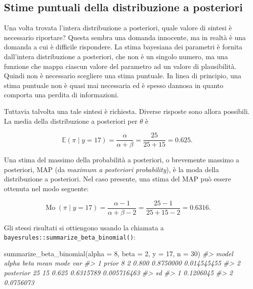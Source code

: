 \documentclass[
  11pt,
  italian,
  a4paper,
  extrafontsizes,onecolumn,openright
  ]{memoir}
\newenvironment{Shaded}{\begin{snugshade}}{\end{snugshade}}
\newcommand{\AttributeTok}[1]{\textcolor[rgb]{0.77,0.63,0.00}{#1}}
\newcommand{\CommentTok}[1]{\textcolor[rgb]{0.56,0.35,0.01}{\textit{#1}}}
\newcommand{\DecValTok}[1]{\textcolor[rgb]{0.00,0.00,0.81}{#1}}
\newcommand{\FunctionTok}[1]{\textcolor[rgb]{0.00,0.00,0.00}{#1}}
\newcommand{\NormalTok}[1]{#1}
\DeclareMathOperator{\Mo}{Mo} %
\newcommand{\E}{\mathbb{E}} %
\begin{document}
\hypertarget{stime-puntuali-della-distribuzione-a-posteriori}{%
\subsection{Stime puntuali della distribuzione a posteriori}\label{stime-puntuali-della-distribuzione-a-posteriori}}

Una volta trovata l'intera distribuzione a posteriori, quale valore di
sintesi è necessario riportare? Questa sembra una domanda innocente, ma
in realtà è una domanda a cui è difficile rispondere. La stima bayesiana dei parametri è fornita dall'intera distribuzione a posteriori, che non è un singolo numero, ma una funzione che mappa ciascun valore del parametro ad un valore di plausibilità. Quindi non è necessario scegliere una stima puntuale. In linea di principio, una stima puntuale non è quasi mai necessaria ed è spesso dannosa in quanto comporta una perdita di informazioni.

Tuttavia talvolta una tale sintesi è richiesta. Diverse risposte sono allora possibili. La media della distribuzione a posteriori per \(\theta\) è

\[
\E(\pi \mid y = 17) = \frac{\alpha}{\alpha + \beta} = \frac{25}{25+15} = 0.625.
\]

Una stima del massimo della probabilità a posteriori, o brevemente massimo a posteriori, MAP (da \emph{maximum a posteriori probability}), è la moda della distribuzione a posteriori. Nel caso presente, una stima del MAP può essere ottenuta nel modo seguente:

\[
\Mo(\pi \mid y = 17) = \frac{\alpha-1}{\alpha + \beta-2} = \frac{25-1}{25+15-2} = 0.6316.
\]

Gli stessi risultati si ottiengono usando la chiamata a \texttt{bayesrules::summarize\_beta\_binomial()}:

\begin{Shaded}
\begin{Highlighting}[]
\FunctionTok{summarize\_beta\_binomial}\NormalTok{(}\AttributeTok{alpha =} \DecValTok{8}\NormalTok{, }\AttributeTok{beta =} \DecValTok{2}\NormalTok{, }\AttributeTok{y =} \DecValTok{17}\NormalTok{, }\AttributeTok{n =} \DecValTok{30}\NormalTok{)}
\CommentTok{\#\textgreater{}       model alpha beta  mean      mode         var}
\CommentTok{\#\textgreater{} 1     prior     8    2 0.800 0.8750000 0.014545455}
\CommentTok{\#\textgreater{} 2 posterior    25   15 0.625 0.6315789 0.005716463}
\CommentTok{\#\textgreater{}          sd}
\CommentTok{\#\textgreater{} 1 0.1206045}
\CommentTok{\#\textgreater{} 2 0.0756073}
\end{Highlighting}
\end{Shaded}
\end{document}
